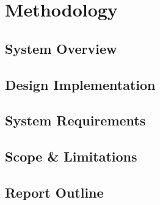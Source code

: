 \documentclass[class=report,11pt,crop=false]{standalone}
\begin{document}
	\chapter{Methodology}
	

	
	\section{System Overview}
	\lipsum[1]
	
	\section{Design Implementation}
	\lipsum[1]
	
	\section{System Requirements}
	\lipsum[1]
	
	\section{Scope \& Limitations}
	\lipsum[1]
	
	\section{Report Outline}
	\lipsum[1]
	
	\ifstandalone
	
	\printnoidxglossary[type=\acronymtype,nonumberlist]
	\fi
\end{document}
